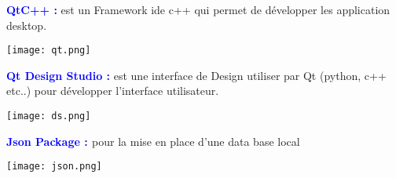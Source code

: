 \documentclass[12pt, a4paper]{report}
\begin{document}

\textbf{\textcolor{blue}{QtC++ :}} est un Framework ide c++ qui permet de développer les application desktop.
\bigskip
\begin{center}
\texttt{[image: qt.png]} 
\end{center}

\textbf{\textcolor{blue}{Qt Design Studio :} } est une interface de Design utiliser par Qt (python, c++ etc..) pour développer l’interface utilisateur.
\bigskip
\begin{center}
\texttt{[image: ds.png]} 
\end{center}
\textbf{\textcolor{blue}{Json Package : }} pour la mise en place d’une data base local
\bigskip
\begin{center}
\texttt{[image: json.png]} 
\end{center}
\end{document}
